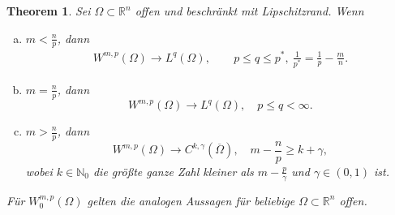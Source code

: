 \documentclass[
paper=a4,
bibtotocnumbered,
liststotocnumbered,
tablecaptionabove,
pointlessnumbers,
twoside,
openright,
10pt
]
{report}
\newtheorem{thm}{Theorem}[chapter]
\theoremstyle{definition}
\numberwithin{equation}{chapter}
\begin{document}
\begin{thm}
Sei $\Omega \subset \mathbb R^n$ offen und beschränkt mit Lipschitzrand. Wenn
\begin{enumerate}[a)]
\item $m<\frac{n}{p}$, dann
\begin{align*}
W^{m,p}(\Omega) \to L^q(\Omega),&\ \quad p\le q \le p^*, \ \frac{1}{p^*} = \frac{1}{p} - \frac{m}{n}.
\end{align*}
\item $m= \frac{n}{p}$, dann
\begin{equation}
W^{m,p}(\Omega) \to L^q(\Omega), \quad p \le q <\infty.
\end{equation}
\item $m>\frac{n}{p}$, dann
\begin{equation}
W^{m,p}(\Omega) \to C^{k,\gamma}(\overline{\Omega}), \quad m- \frac{n}{p} \ge k + \gamma,
\end{equation}
wobei $k \in \mathbb N_0$ die größte ganze Zahl kleiner als $m- \frac{p}{\gamma}$ und $\gamma \in (0,1)$ ist.
\end{enumerate} 
Für $W_0^{m,p}(\Omega)$ gelten die analogen Aussagen für beliebige $\Omega \subset \mathbb R^n$ offen.
\end{thm}
\end{document}
